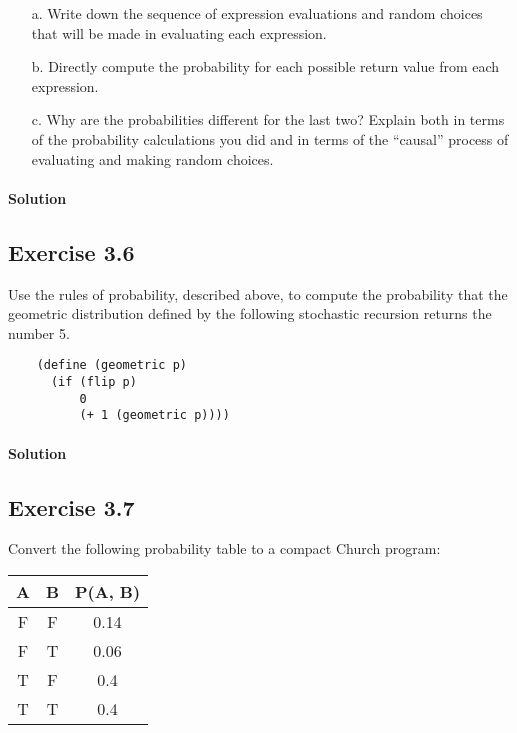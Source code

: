 \begin{itemize}
    \item[a.] Write down the sequence of expression evaluations and random choices that will be made in evaluating each expression.
    \item[b.] Directly compute the probability for each possible return value from each expression.
    \item[c.] Why are the probabilities different for the last two? Explain both in terms of the probability calculations 
        you did and in terms of the “causal” process of evaluating and making random choices.
\end{itemize}

\paragraph{Solution}


\subsection*{Exercise 3.6}
Use the rules of probability, described above, to compute the probability that the geometric distribution 
defined by the following stochastic recursion returns the number 5.

\begin{lstlisting}
    (define (geometric p)
      (if (flip p)
          0
          (+ 1 (geometric p))))
\end{lstlisting}

\paragraph{Solution}


\subsection*{Exercise 3.7}
Convert the following probability table to a compact Church program:
\begin{table}[h]
    \begin{center}
        \begin{tabular}{ccc}
            \hline
            A & B & P(A, B) \\
            \hline
            F & F & 0.14 \\
            F & T & 0.06 \\
            T & F & 0.4 \\
            T & T & 0.4 \\
            \hline
        \end{tabular}
    \end{center}
    
\end{table}

